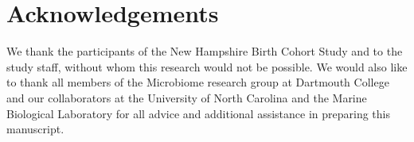 \section{Acknowledgements}
We thank the participants of the New Hampshire Birth Cohort Study and to the study staff, without whom this research would not be possible. We would also like to thank all members of the Microbiome research group at Dartmouth College and our collaborators at the University of North Carolina and the Marine Biological Laboratory for all advice and additional assistance in preparing this manuscript.  